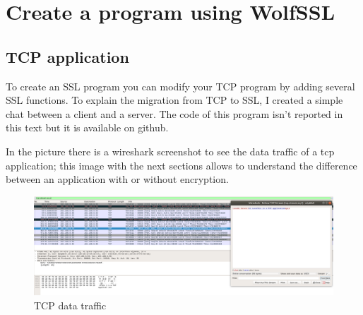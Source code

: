 \documentclass[a4paper,12pt]{report}
\begin{document}
\chapter{Create a program using WolfSSL}
\section{TCP application}
To create an SSL program you can modify your TCP program by adding several SSL functions. To explain the migration from TCP to SSL, I created a simple chat between a client and a server. The code of this program isn't reported in this text but it is available on github.

\vspace{5mm} %
In the picture there is a wireshark screenshot to see the data traffic of a tcp application; this image with the next sections allows to understand the difference between an application with or without encryption.

\begin{figure}[H]
    \centering
    \includegraphics[scale=0.23]{./code/tcp/img/test.png}
    \caption{TCP data traffic}
    
\end{figure}
\end{document}
